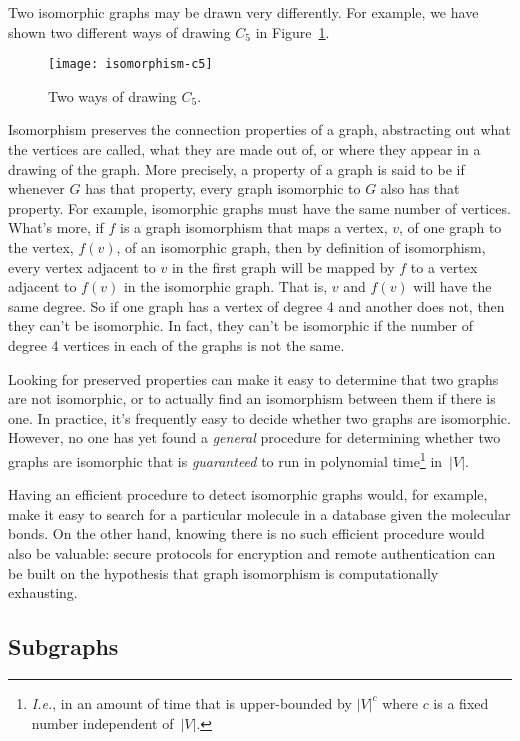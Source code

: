 Two isomorphic graphs may be drawn very differently.  For example, we
have shown two different ways of drawing $C_5$ in
Figure~\ref{fig:isomorphism-c5}.

\begin{figure}[h]
\texttt{[image: isomorphism-c5]}
\caption{Two ways of drawing $C_5$.}
\label{fig:isomorphism-c5}
\end{figure}

Isomorphism preserves the connection properties of a graph,
abstracting out what the vertices are called, what they are made out
of, or where they appear in a drawing of the graph.  More precisely, a
property of a graph is said to be 
if whenever $G$ has that property, every graph isomorphic to $G$ also
has that property.  For example, isomorphic graphs must have the same
number of vertices.  What's more, if $f$ is a graph isomorphism that
maps a vertex, $v$, of one graph to the vertex, $f(v)$, of an
isomorphic graph, then by definition of isomorphism, every vertex
adjacent to $v$ in the first graph will be mapped by $f$ to a vertex
adjacent to $f(v)$ in the isomorphic graph.  That is, $v$ and $f(v)$
will have the same degree.  So if one graph has a vertex of degree 4
and another does not, then they can't be isomorphic.  In fact, they
can't be isomorphic if the number of degree 4 vertices in each of the
graphs is not the same.

Looking for preserved properties can make it easy to determine that
two graphs are not isomorphic, or to actually find an isomorphism
between them if there is one.  In practice, it's frequently easy to
decide whether two graphs are isomorphic.  However, no one has yet
found a
\emph{general} procedure for determining whether two graphs are isomorphic
that is \emph{guaranteed} to run in polynomial
time\footnote{\emph{I.e.}, in an amount of time that is upper-bounded
  by $|V|^c$ where $c$ is a fixed number independent of~$|V|$.}
in~$|V|$.

Having an efficient procedure to detect isomorphic graphs would, for
example, make it easy to search for a particular molecule in a database
given the molecular bonds.  On the other hand, knowing there is no such
efficient procedure would also be valuable: secure protocols for
encryption and remote authentication can be built on the hypothesis that
graph isomorphism is computationally exhausting.

\subsection{Subgraphs}

